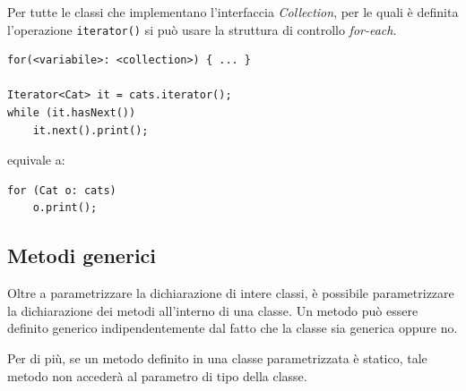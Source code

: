 \documentclass[12pt]{report}
\begin{document}
Per tutte le classi che implementano l'interfaccia \textit{Collection}, per le quali è definita l'operazione \texttt{iterator()} si può usare la struttura di controllo \textit{for-each}.
\begin{lstlisting}[style=javastyle]
for(<variabile>: <collection>) { ... }

Iterator<Cat> it = cats.iterator();
while (it.hasNext())
	it.next().print();
\end{lstlisting}
equivale a:
\begin{lstlisting}[style=javastyle]
for (Cat o: cats)
	o.print();
\end{lstlisting}

\subsection{Metodi generici}
Oltre a parametrizzare la dichiarazione di intere classi, è possibile parametrizzare la dichiarazione dei metodi all'interno di una classe. Un metodo può essere definito generico indipendentemente dal fatto che la classe sia generica oppure no.

Per di più, se un metodo definito in una classe parametrizzata è statico, tale metodo non accederà al parametro di tipo della classe.
\end{document}
